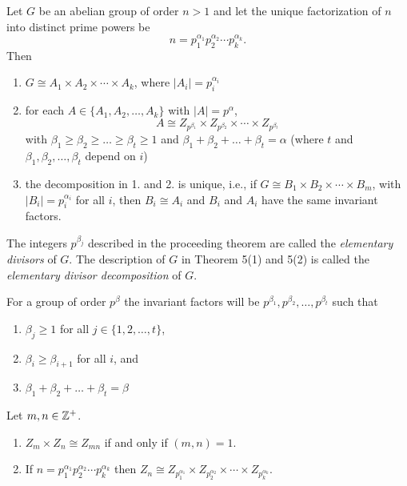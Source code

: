 \documentclass[../main]{subfiles}
\begin{document}
\begin{thm}
 Let $G$ be an abelian group of order $n > 1$ and let the unique factorization of $n$ into distinct prime powers be 
 \[ n = p_1^{\alpha_1} p_2^{\alpha_2} \cdots p_k^{\alpha_k}. \]
 Then 
 \begin{enumerate}
  \item $G \cong A_1 \times A_2 \times \cdots \times A_k$, where $|A_i| = p_i^{\alpha_i}$
  
  \item for each $A \in \{ A_1, A_2, \ldots , A_k \}$ with $|A| = p^\alpha$,
  \[ A \cong Z_{p^{\beta_1}} \times Z_{p^{\beta_2}} \times \cdots \times Z_{p^{\beta_t}} \]
  with $\beta_1 \geq \beta_2 \geq \ldots \geq \beta_t \geq 1$ and $\beta_1 + \beta_2 + \ldots + \beta_t = \alpha$ (where $t$ and $\beta_1, \beta_2, \ldots , \beta_t$ depend on $i$)
  
  \item the decomposition in 1. and 2. is unique, i.e., if $G \cong B_1 \times B_2 \times \cdots \times B_m$, with $|B_i| = p_i^{\alpha_i}$ for all $i$, then $B_i \cong A_i$ and $B_i$ and $A_i$ have the same invariant factors.
 \end{enumerate}
\end{thm}


\begin{dfn}
 The integers $p^{\beta_j}$ described in the proceeding theorem are called the \textit{elementary divisors} of $G$. The description of $G$ in Theorem 5(1) and 5(2) is called the \textit{elementary divisor decomposition} of $G$. 
\end{dfn}


\begin{nt}
 For a group of order $p^\beta$ the invariant factors will be $p^{\beta_1}, p^{\beta_2}, \ldots , p^{\beta_t}$ such that
 \begin{enumerate}
  \item $\beta_j \geq 1$ for all $j \in \{1,2, \ldots ,t\}$,
  
  \item $\beta_i \geq \beta_{i+1}$ for all $i$, and 
  
  \item $\beta_1 + \beta_2 + \ldots + \beta_t = \beta$
 \end{enumerate}
\end{nt}


\begin{prop}
 Let $m,n \in \mathbb{Z}^+$.
 \begin{enumerate}
  \item $Z_m \times Z_n \cong Z_{mn}$ if and only if $(m,n) = 1$.
  
  \item If $n = p_1^{\alpha_1} p_2^{\alpha_2} \cdots p_k^{\alpha_k}$ then $Z_n \cong Z_{p_1^{\alpha_1}} \times Z_{p_2^{\alpha_2}} \times \cdots \times Z_{p_k^{\alpha_k}}$.
 \end{enumerate}
\end{prop}
\end{document}
